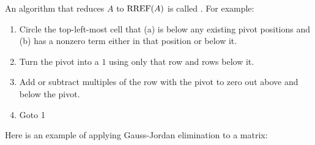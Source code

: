 
\begin{applicationActivities}{3}{5}

\begin{definition}
  An algorithm that reduces \(A\) to \(\operatorname{RREF}(A)\) is called
  . For example:
    \begin{enumerate}
      \item Circle the top-left-most cell that (a) is below any existing pivot
      positions and (b) has a nonzero term either in that position or below it.
	\item Turn the pivot into a $1$ using only that row and rows below it.
	\item Add or subtract multiples of the row with the pivot to zero out above and below the pivot.
      \item Goto 1
    \end{enumerate}
\end{definition}

\begin{observation}
  Here is an example of applying Gauss-Jordan elimination to a matrix:


\end{observation}
\end{applicationActivities}
